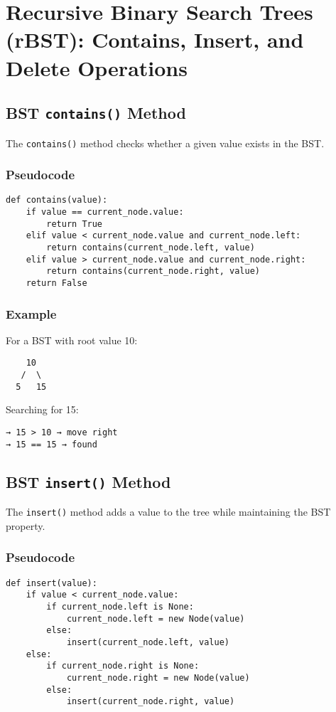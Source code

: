 

\section{Recursive Binary Search Trees (rBST): Contains, Insert, and Delete Operations}

\subsection{BST \texttt{contains()} Method}

The \texttt{contains()} method checks whether a given value exists in the BST.

\subsubsection*{Pseudocode}
\begin{verbatim}
def contains(value):
    if value == current_node.value:
        return True
    elif value < current_node.value and current_node.left:
        return contains(current_node.left, value)
    elif value > current_node.value and current_node.right:
        return contains(current_node.right, value)
    return False
\end{verbatim}

\subsubsection*{Example}

For a BST with root value 10:
\begin{verbatim}
    10
   /  \
  5   15
\end{verbatim}
Searching for 15:
\begin{verbatim}
→ 15 > 10 → move right
→ 15 == 15 → found
\end{verbatim}

\subsection{BST \texttt{insert()} Method}

The \texttt{insert()} method adds a value to the tree while maintaining the BST property.

\subsubsection*{Pseudocode}
\begin{verbatim}
def insert(value):
    if value < current_node.value:
        if current_node.left is None:
            current_node.left = new Node(value)
        else:
            insert(current_node.left, value)
    else:
        if current_node.right is None:
            current_node.right = new Node(value)
        else:
            insert(current_node.right, value)
\end{verbatim}

